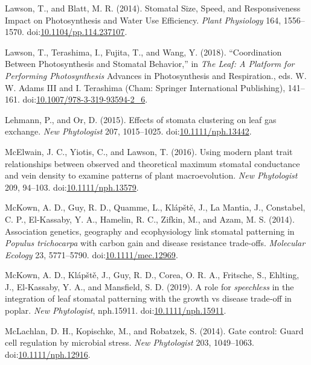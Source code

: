 \documentclass[utf8]{frontiersSCNS}
\newlength{\cslhangindent}
\newenvironment{cslreferences}%
  {\setlength{\parindent}{0pt}%
  \everypar{\setlength{\hangindent}{\cslhangindent}}\ignorespaces}%
  {\par}
\begin{document}
\begin{cslreferences}
\leavevmode\hypertarget{ref-lawson_stomatal_2014}{}%
Lawson, T., and Blatt, M. R. (2014). Stomatal Size, Speed, and
Responsiveness Impact on Photosynthesis and Water Use Efficiency.
\emph{Plant Physiology} 164, 1556--1570.
doi:\href{https://doi.org/10.1104/pp.114.237107}{10.1104/pp.114.237107}.

\leavevmode\hypertarget{ref-lawson_coordination_2018}{}%
Lawson, T., Terashima, I., Fujita, T., and Wang, Y. (2018).
``Coordination Between Photosynthesis and Stomatal Behavior,'' in
\emph{The Leaf: A Platform for Performing Photosynthesis} Advances in
Photosynthesis and Respiration., eds. W. W. Adams III and I. Terashima
(Cham: Springer International Publishing), 141--161.
doi:\href{https://doi.org/10.1007/978-3-319-93594-2_6}{10.1007/978-3-319-93594-2\_6}.

\leavevmode\hypertarget{ref-lehmann_effects_2015}{}%
Lehmann, P., and Or, D. (2015). Effects of stomata clustering on leaf
gas exchange. \emph{New Phytologist} 207, 1015--1025.
doi:\href{https://doi.org/10.1111/nph.13442}{10.1111/nph.13442}.

\leavevmode\hypertarget{ref-mcelwain_using_2016}{}%
McElwain, J. C., Yiotis, C., and Lawson, T. (2016). Using modern plant
trait relationships between observed and theoretical maximum stomatal
conductance and vein density to examine patterns of plant
macroevolution. \emph{New Phytologist} 209, 94--103.
doi:\href{https://doi.org/10.1111/nph.13579}{10.1111/nph.13579}.

\leavevmode\hypertarget{ref-mckown_association_2014}{}%
McKown, A. D., Guy, R. D., Quamme, L., Klápště, J., La Mantia, J.,
Constabel, C. P., El-Kassaby, Y. A., Hamelin, R. C., Zifkin, M., and
Azam, M. S. (2014). Association genetics, geography and ecophysiology
link stomatal patterning in \emph{Populus trichocarpa} with carbon gain
and disease resistance trade-offs. \emph{Molecular Ecology} 23,
5771--5790.
doi:\href{https://doi.org/10.1111/mec.12969}{10.1111/mec.12969}.

\leavevmode\hypertarget{ref-mckown_role_2019}{}%
McKown, A. D., Klápště, J., Guy, R. D., Corea, O. R. A., Fritsche, S.,
Ehlting, J., El‐Kassaby, Y. A., and Mansfield, S. D. (2019). A role for
\emph{speechless} in the integration of leaf stomatal patterning with
the growth vs disease trade‐off in poplar. \emph{New Phytologist},
nph.15911.
doi:\href{https://doi.org/10.1111/nph.15911}{10.1111/nph.15911}.

\leavevmode\hypertarget{ref-mclachlan_gate_2014}{}%
McLachlan, D. H., Kopischke, M., and Robatzek, S. (2014). Gate control:
Guard cell regulation by microbial stress. \emph{New Phytologist} 203,
1049--1063.
doi:\href{https://doi.org/10.1111/nph.12916}{10.1111/nph.12916}.


\end{cslreferences}
\end{document}
